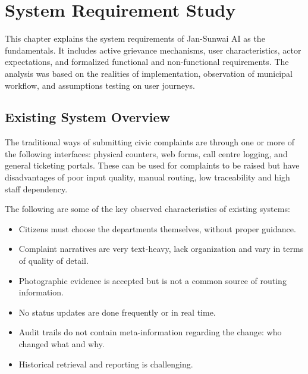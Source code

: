 \chapter{System Requirement Study}

This chapter explains the system requirements of Jan-Sunwai AI as the fundamentals. It includes active grievance mechanisms, user characteristics, actor expectations, and formalized functional and non-functional requirements. The analysis was based on the realities of implementation, observation of municipal workflow, and assumptions testing on user journeys.

\section{Existing System Overview}

The traditional ways of submitting civic complaints are through one or more of the following interfaces: physical counters, web forms, call centre logging, and general ticketing portals. These can be used for complaints to be raised but have disadvantages of poor input quality, manual routing, low traceability and high staff dependency.

The following are some of the key observed characteristics of existing systems:

\begin{itemize}
\item Citizens must choose the departments themselves, without proper guidance.
\item Complaint narratives are very text-heavy, lack organization and vary in terms of quality of detail.
\item Photographic evidence is accepted but is not a common source of routing information.
\item No status updates are done frequently or in real time.
\item Audit trails do not contain meta-information regarding the change: who changed what and why.
\item Historical retrieval and reporting is challenging.
\end{itemize}

